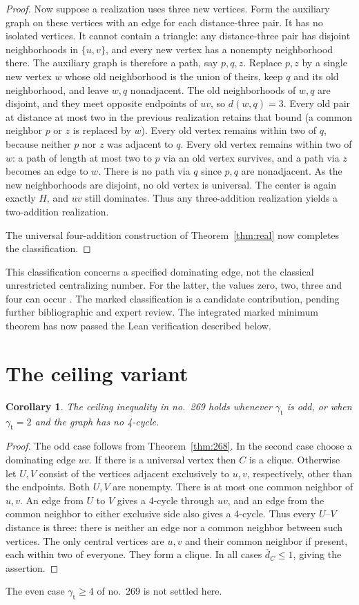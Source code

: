 \documentclass[11pt]{article}
\newtheorem{cor}[thm]{Corollary}
\newcommand{\gt}{\gamma_{\mathrm t}}
\newcommand{\av}{\overline d_C}
\begin{document}
\begin{proof}
Now suppose a realization uses three new vertices. Form the auxiliary
graph on these vertices with an edge for each distance-three pair.
It has no isolated vertices. It cannot contain a triangle: any
distance-three pair has disjoint neighborhoods in $\{u,v\}$,
and every new vertex has a nonempty neighborhood there.
The auxiliary graph is therefore a path, say $p,q,z$.
Replace $p,z$ by a single new vertex $w$ whose old neighborhood is the
union of theirs, keep $q$ and its old neighborhood, and leave $w,q$
nonadjacent. The old neighborhoods of $w,q$ are disjoint, and they
meet opposite endpoints of $uv$, so $d(w,q)=3$.
Every old pair at distance at most two in the previous realization
retains that bound (a common neighbor $p$ or $z$ is replaced by $w$).
Every old vertex remains within two of $q$, because neither $p$ nor
$z$ was adjacent to $q$. Every old vertex remains within two of $w$:
a path of length at most two to $p$ via an old vertex survives, and a
path via $z$ becomes an edge to $w$. There is no path via $q$ since
$p,q$ are nonadjacent. As the new neighborhoods are disjoint, no
old vertex is universal. The center is again exactly $H$, and $uv$
still dominates. Thus any three-addition realization yields a
two-addition realization.

The universal four-addition construction of Theorem~\ref{thm:real}
now completes the classification.
\end{proof}

This classification concerns a specified dominating edge, not the
classical unrestricted centralizing number. For the latter, the
values zero, two, three and four can occur \cite{bms,behrens}.
The marked classification is a candidate contribution, pending
further bibliographic and expert review. The integrated marked minimum
theorem has now passed the Lean verification described below.

\section{The ceiling variant}
\begin{cor}\label{cor:269}
The ceiling inequality in no.\ 269 holds whenever $\gt$ is odd, or when
$\gt=2$ and the graph has no 4-cycle.
\end{cor}
\begin{proof}
The odd case follows from Theorem~\ref{thm:268}. In the second case choose a
dominating edge $uv$. If there is a universal vertex then $C$ is a clique.
Otherwise let $U,V$ consist of the vertices adjacent exclusively to $u,v$,
respectively, other than the endpoints. Both $U,V$ are nonempty.
There is at most one common neighbor of $u,v$. An edge from $U$ to $V$
gives a 4-cycle through $uv$, and an edge from the common neighbor to
either exclusive side also gives a 4-cycle. Thus every $U$--$V$ distance
is three: there is neither an edge nor a common neighbor between such
vertices. The only central vertices are $u,v$ and their common neighbor
if present, each within two of everyone. They form a clique. In all cases
$\av\le1$, giving the assertion.
\end{proof}
The even case $\gt\ge4$ of no.\ 269 is not settled here.
\end{document}
